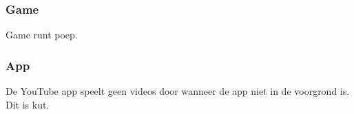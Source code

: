 \documentclass[11pt,english]{article}
\begin{document}
  \subsubsection{Game}
  \begin{center}
  \end{center}
  Game runt poep.

  \subsubsection{App}
  \begin{center}
  \end{center}
  De YouTube app speelt geen videos door wanneer de app niet in de voorgrond is.
  Dit is kut.
\end{document}
